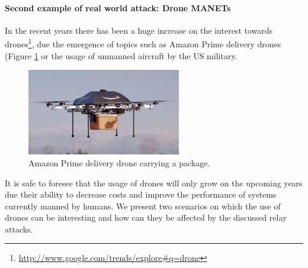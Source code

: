 \documentclass{article}
\begin{document}
\paragraph{Second example of real world attack: Drone MANETs}

In the recent years there has been a huge increase on the interest towards drones\footnote{\url{http://www.google.com/trends/explore#q=drone}}, due the emergence of topics such as Amazon Prime delivery drones (Figure \ref{fig:amazondrone} or the usage of unmanned aircraft by the US military.


\begin{figure}[h!]
  \centering
    \includegraphics[width=0.6\textwidth]{images/amazonprimedrone.png}
  \caption{Amazon Prime delivery drone carrying a package.}
  \label{fig:amazondrone}
\end{figure}

It is safe to foresee that the usage of drones will only grow on the upcoming years due their ability to decrease costs and improve the performance of systems currently manned by humans. We present two scenarios on which the use of drones can be interesting and how can they be affected by the discussed relay attacks.
\end{document}
